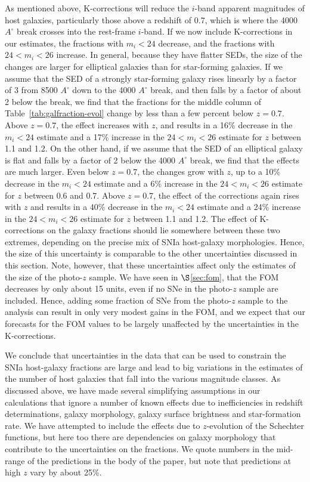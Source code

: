 \documentclass[preprint2]{aastex}    %
\begin{document}
As mentioned above, K-corrections will reduce the $i$-band apparent magnitudes of host galaxies, 
particularly those above a redshift of 0.7, which is where the 4000 $A^\circ$ break 
crosses into the rest-frame $i$-band. 
If we now include K-corrections in our estimates, the fractions with
$m_i<24$ decrease, and the fractions with $24<m_i<26$ increase. 
In general, because they have flatter SEDs, the size of the changes are larger for elliptical 
galaxies than for star-forming galaxies. If we assume that the SED of a strongly star-forming galaxy rises linearly by a factor of 3
from 8500  $A^\circ$ down to the 
4000 $A^\circ$ break, and then falls by a factor of about 2 below the break, we find that the fractions for the middle column of
Table~\ref{tab:galfraction-evol} change by less than a few percent below $z=0.7$. Above $z=0.7$, the effect increases with $z$,
and results in a 16\% decrease in the  $m_i<24$ estimate and a 17\% increase in the $24<m_i<26$ estimate for $z$ between 1.1 and 1.2.
On the other hand, if we assume that the SED of an elliptical galaxy is flat and falls by a factor of 2 below the 
4000 $A^\circ$ break, we find that the effects are much larger. Even below $z=0.7$, the changes grow with $z$, up to a 10\% decrease
in the  $m_i<24$ estimate and a 6\% increase in the $24<m_i<26$ estimate for $z$ between 0.6 and 0.7.
Above $z=0.7$, the effect of the corrections again rises with $z$ and results in a 40\% decrease in the $m_i<24$ estimate and a 24\% increase 
in the $24<m_i<26$ estimate for $z$ between 1.1 and 1.2. The effect of K-corrections on the galaxy fractions should lie somewhere
between these two extremes, depending on the precise mix of SNIa host-galaxy morphologies. Hence, the size of this uncertainty 
is comparable to the other uncertainties discussed in this section.
Note, however, that these uncertainties affect only the estimates of the size of the photo-$z$ sample. We have seen in 
$\S$\ref{sec:fom}, that the FOM decreases by only about 15 units, even if no SNe in the photo-$z$ sample are included.     
Hence, adding some fraction of SNe from the photo-$z$ sample to the analysis can result in only very modest gains in the FOM, and 
we expect that our forecasts for the FOM values to be largely unaffected by the uncertainties in the K-corrections.
 
We conclude that uncertainties in the data that can be used to constrain the SNIa host-galaxy fractions
are large and lead to big variations in the estimates of the number of host galaxies that fall into the various 
magnitude classes. As discussed above, we have made several simplifying assumptions in our calculations that 
ignore a number of known effects due to inefficiencies in redshift determinations, galaxy morphology,
galaxy surface brightness and star-formation rate. We have attempted to include the effects due
to $z$-evolution of the Schechter functions, but here too there are dependencies on galaxy morphology 
that contribute to the uncertainties on the fractions. 
We quote numbers in the mid-range of the predictions in the body of the paper, but note that
predictions at high $z$ vary by about 25\%. 
\end{document}
